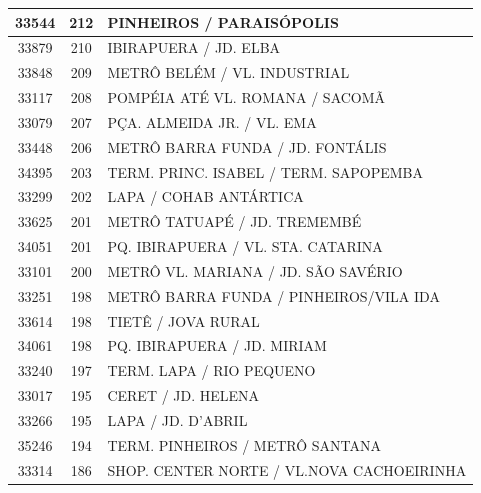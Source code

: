 \documentclass[
	12pt,				%
	oneside,			%
	a4paper,			%
	english,			%
	brazil				%
	]{abntex2ppgsi}
\begin{document}
{{\begin{apendicesenv}
\begin{longtable}{c|c|p{7cm}}
    33544 & 212   & PINHEIROS / PARAISÓPOLIS \\
\hline

    33879 & 210   & IBIRAPUERA / JD. ELBA \\
\hline

    33848 & 209   & METRÔ BELÉM / VL. INDUSTRIAL \\
\hline

    33117 & 208   & POMPÉIA ATÉ VL. ROMANA / SACOMÃ \\
\hline

    33079 & 207   & PÇA. ALMEIDA JR. / VL. EMA \\
\hline

    33448 & 206   & METRÔ BARRA FUNDA / JD. FONTÁLIS \\
\hline

    34395 & 203   & TERM. PRINC. ISABEL / TERM. SAPOPEMBA \\
\hline

    33299 & 202   & LAPA / COHAB ANTÁRTICA \\
\hline

    33625 & 201   & METRÔ TATUAPÉ / JD. TREMEMBÉ \\
\hline

    34051 & 201   & PQ. IBIRAPUERA / VL. STA. CATARINA \\
\hline

    33101 & 200   & METRÔ VL. MARIANA / JD. SÃO SAVÉRIO \\
\hline

    33251 & 198   & METRÔ BARRA FUNDA / PINHEIROS/VILA IDA  \\
\hline

    33614 & 198   & TIETÊ / JOVA RURAL \\
\hline

    34061 & 198   & PQ. IBIRAPUERA / JD. MIRIAM \\
\hline

    33240 & 197   & TERM. LAPA / RIO PEQUENO \\
\hline

    33017 & 195   & CERET / JD. HELENA \\
\hline

    33266 & 195   & LAPA / JD. D'ABRIL \\
\hline

    35246 & 194   & TERM. PINHEIROS / METRÔ SANTANA \\
\hline

    33314 & 186   & SHOP. CENTER NORTE / VL.NOVA CACHOEIRINHA \\
\hline


\end{longtable}
\end{apendicesenv}}}
\end{document}
